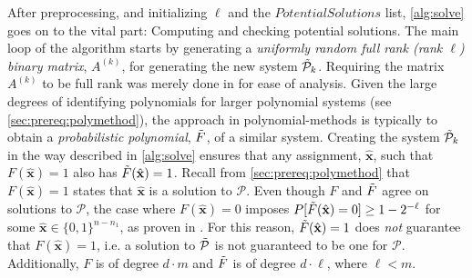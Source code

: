 After preprocessing, and initializing $\ell$ and the $PotentialSolutions$ list, \cref{alg:solve} goes on to the vital part: Computing and checking potential solutions. The main loop of the algorithm starts by generating a \textit{uniformly random full rank (rank $\ell$) binary matrix}, $A^{(k)}$, for generating the new system $\Tilde{\mathcal{P}}_k$. Requiring the matrix $A^{(k)}$ to be full rank was merely done in \cite{eurocrypt-2021-30841} for ease of analysis. Given the large degrees of identifying polynomials for larger polynomial systems (see \cref{sec:prereq:polymethod}), the approach in polynomial-methods is typically to obtain a \textit{probabilistic polynomial}, $\Tilde{F}$, of a similar system. Creating the system $\Tilde{\mathcal{P}}_k$ in the way described in \cref{alg:solve} ensures that any assignment, $\hat{\mathbf{x}}$, such that $F(\hat{\mathbf{x}}) = 1$ also has $\Tilde{F}(\hat{\mathbf{x}}) = 1$. Recall from \cref{sec:prereq:polymethod} that $F(\hat{\mathbf{x}}) = 1$ states that $\hat{\mathbf{x}}$ is a solution to $\mathcal{P}$. Even though $F$ and $\Tilde{F}$ agree on solutions to $\mathcal{P}$, the case where $F(\hat{\mathbf{x}}) = 0$ imposes $P[\Tilde{F}(\hat{\mathbf{x}}) = 0] \geq 1 - 2^{-\ell}$ for some $\hat{\mathbf{x}} \in \{0,1\}^{n - n_1}$, as proven in \cite{eurocrypt-2021-30841}. For this reason, $\Tilde{F}(\hat{\mathbf{x}}) = 1$ does \textit{not} guarantee that $F(\hat{\mathbf{x}}) = 1$, i.e. a solution to $\Tilde{\mathcal{P}}$ is not guaranteed to be one for $\mathcal{P}$. Additionally, $F$ is of degree $d \cdot m$ and $\Tilde{F}$ is of degree $d \cdot \ell$, where $\ell < m$.

